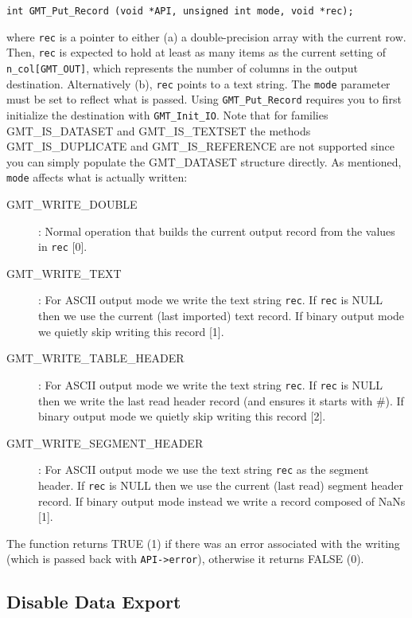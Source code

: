 \documentclass[11pt]{report}
\begin{document}
\begin{verbatim}
int GMT_Put_Record (void *API, unsigned int mode, void *rec);
\end{verbatim}
where \texttt{rec} is a pointer to either (a) a double-precision array with the current row.
Then, \texttt{rec} is expected to hold at least as many items as the current setting of
\texttt{n\_col[GMT\_OUT]}, which represents the number of columns in the output destination.
Alternatively (b), \texttt{rec} points to a text string.
The \texttt{mode} parameter must be set to reflect what is passed.  Using \texttt{GMT\_Put\_Record}
requires you to first initialize the destination with \texttt{GMT\_Init\_IO}.
Note that for families GMT\_IS\_DATASET and GMT\_IS\_TEXTSET the methods GMT\_IS\_DUPLICATE and GMT\_IS\_REFERENCE are not supported since
you can simply populate the GMT\_DATASET structure directly.
As mentioned, \texttt{mode} affects what is actually written:
\begin{description}
\item [GMT\_WRITE\_DOUBLE]: Normal operation that builds the current output record from
the values in \texttt{rec} [0].
\item [GMT\_WRITE\_TEXT]: For ASCII output mode we write the text string \texttt{rec}.
If \texttt{rec} is NULL then we use the current (last imported) text record.
If binary output mode we quietly skip writing this record [1].
\item [GMT\_WRITE\_TABLE\_HEADER]: For ASCII output mode we write the text string \texttt{rec}.
If \texttt{rec} is NULL then we write the last read
header record (and ensures it starts with \#). If binary output mode we quietly skip writing this record [2].
\item [GMT\_WRITE\_SEGMENT\_HEADER]: For ASCII output mode we use the text string \texttt{rec} as the segment header.
If \texttt{rec} is NULL then we use the current (last read) segment header record.
If binary output mode instead we write a record composed of NaNs [1].
\end{description}
The function returns TRUE (1) if there was an error associated with the writing (which is passed back with \texttt{API->error}),
otherwise it returns FALSE (0).

\subsection{Disable Data Export}
\end{document}
